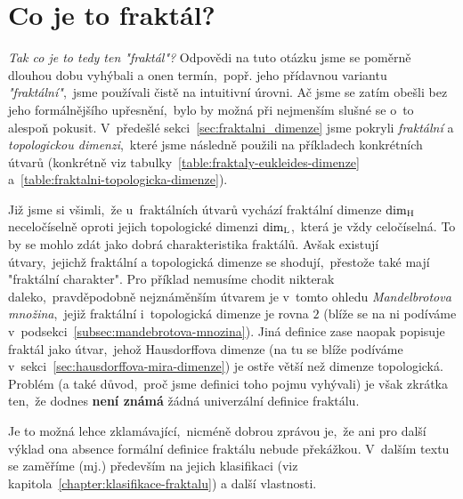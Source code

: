 \section{Co je to fraktál?}\label{sec:co-je-to-fraktal}
\emph{Tak co je to tedy ten "fraktál"?} Odpovědi na tuto otázku jsme se poměrně dlouhou dobu vyhýbali a onen termín,~popř. jeho přídavnou variantu \emph{"fraktální"},~jsme používali čistě na intuitivní úrovni. Ač jsme se zatím obešli bez jeho formálnějšího upřesnění,~bylo by možná při nejmenším slušné se o~to alespoň pokusit. V~předešlé sekci~\ref{sec:fraktalni_dimenze} jsme pokryli \emph{fraktální} a \emph{topologickou dimenzi},~které jsme následně použili na příkladech konkrétních útvarů (konkrétně viz tabulky~\ref{table:fraktaly-eukleides-dimenze} a~\ref{table:fraktalni-topologicka-dimenze}).

Již jsme si všimli,~že u~fraktálních útvarů vychází fraktální dimenze $\operatorname{dim_H}$ neceločíselně oproti jejich topologické dimenzi $\operatorname{dim_L}$,~která je vždy celočíselná. To by se mohlo zdát jako dobrá charakteristika fraktálů. Avšak existují útvary,~jejichž fraktální a topologická dimenze se shodují,~přestože také mají "fraktální charakter". Pro příklad nemusíme chodit nikterak daleko,~pravděpodobně nejznáměnším útvarem je v~tomto ohledu \emph{Mandelbrotova množina},~jejiž fraktální i~topologická dimenze je rovna $2$ (blíže se na ni podíváme v~podsekci~\ref{subsec:mandebrotova-mnozina}). Jiná definice zase naopak popisuje fraktál jako útvar,~jehož Hausdorffova dimenze (na tu se blíže podíváme v~sekci~\ref{sec:hausdorffova-mira-dimenze}) je ostře větší než dimenze topologická. Problém (a také důvod,~proč jsme definici toho pojmu vyhývali) je však zkrátka ten,~že dodnes \textbf{není známá} žádná univerzální definice fraktálu. \cite[str. 226]{Voracova2022}

Je to možná lehce zklamávající,~nicméně dobrou zprávou je,~že ani pro další výklad ona absence formální definice fraktálu nebude překážkou. V~dalším textu se zaměříme (mj.) především na jejich klasifikaci (viz kapitola~\ref{chapter:klasifikace-fraktalu}) a další vlastnosti.